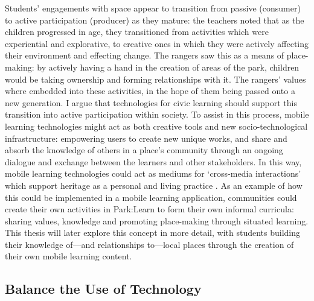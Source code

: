 Students' engagements with space appear to transition from passive (consumer) to active participation (producer) as they mature: the teachers noted that as the children progressed in age, they transitioned from activities which were experiential and explorative, to creative ones in which they were actively affecting their environment and effecting change. The rangers saw this as a means of place-making: by actively having a hand in the creation of areas of the park, children would be taking ownership and forming relationships with it. The rangers’ values where embedded into these activities, in the hope of them being passed onto a new generation. I argue that technologies for civic learning should support this transition into active participation within society. To assist in this process, mobile learning technologies might act as both creative tools and new socio-technological infrastructure: empowering users to create new unique works, and share and absorb the knowledge of others in a place’s community through an ongoing dialogue and exchange between the learners and other stakeholders. In this way, mobile learning technologies could act as mediums for `cross-media interactions' which support heritage as a personal and living practice \citep{Giaccardi2008}. As an example of how this could be implemented in a mobile learning application, communities could create their own activities in Park:Learn to form their own informal curricula: sharing values, knowledge and promoting place-making through situated learning. This thesis will later explore this concept in more detail, with students building their knowledge of---and relationships to---local places through the creation of their own mobile learning content.

\subsection{Balance the Use of Technology}
\label{sec:BalanceTechUse}

